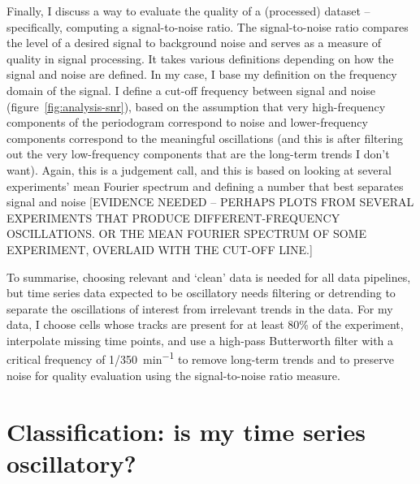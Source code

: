Finally, I discuss a way to evaluate the quality of a (processed) dataset -- specifically, computing a signal-to-noise ratio.
The signal-to-noise ratio compares the level of a desired signal to background noise and serves as a measure of quality in signal processing.
It takes various definitions depending on how the signal and noise are defined.
In my case, I base my definition on the frequency domain of the signal.
I define a cut-off frequency between signal and noise (figure~\ref{fig:analysis-snr}), based on the assumption that very high-frequency components of the periodogram correspond to noise and lower-frequency components correspond to the meaningful oscillations (and this is after filtering out the very low-frequency components that are the long-term trends I don't want).
Again, this is a judgement call, and this is based on looking at several experiments' mean Fourier spectrum and defining a number that best separates signal and noise [EVIDENCE NEEDED -- PERHAPS PLOTS FROM SEVERAL EXPERIMENTS THAT PRODUCE DIFFERENT-FREQUENCY OSCILLATIONS.  OR THE MEAN FOURIER SPECTRUM OF SOME EXPERIMENT, OVERLAID WITH THE CUT-OFF LINE.]

To summarise, choosing relevant and `clean' data is needed for all data pipelines, but time series data expected to be oscillatory needs filtering or detrending to separate the oscillations of interest from irrelevant trends in the data.
For my data, I choose cells whose tracks are present for at least 80\% of the experiment, interpolate missing time points, and use a high-pass Butterworth filter with a critical frequency of \SI[parse-numbers=false]{1/350}{\minute^{-1}} to remove long-term trends and to preserve noise for quality evaluation using the signal-to-noise ratio measure.

\section[Classification]{Classification: is my time series oscillatory?}
\label{sec:analysis-classification}

